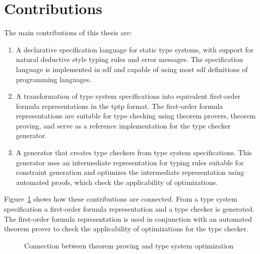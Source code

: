 \section{Contributions}
The main contributions of this thesis are:
\begin{enumerate}
\item A declarative specification language for static type systems,
  with support for natural deductive style typing rules and error
  messages. The specification language is implemented in \gls{sdf} and
  capable of using most \gls{sdf} definitions of programming
  languages.
\item A transformation of type system specifications into equivalent
  first-order formula representations in the \gls{tptp} format. The
  first-order formula representations are suitable for type checking
  using theorem provers, theorem proving, and serve as a reference
  implementation for the type checker generator.
\item A generator that creates type checkers from type system
  specifications. This generator uses an intermediate representation
  for typing rules suitable for constraint generation and optimizes
  the intermediate representation using automated proofs, which check
  the applicability of optimizations.
\end{enumerate}

Figure~\ref{fig:interconnection} shows how these contributions are
connected. From a type system specification a first-order formula
representation and a type checker is generated. The first-order
formula representation is used in conjunction with an automated
theorem prover to check the applicability of optimizations for the
type checker.

\begin{figure}
\caption{Connection between theorem proving and type system
  optimization}
\label{fig:interconnection}
\end{figure}


